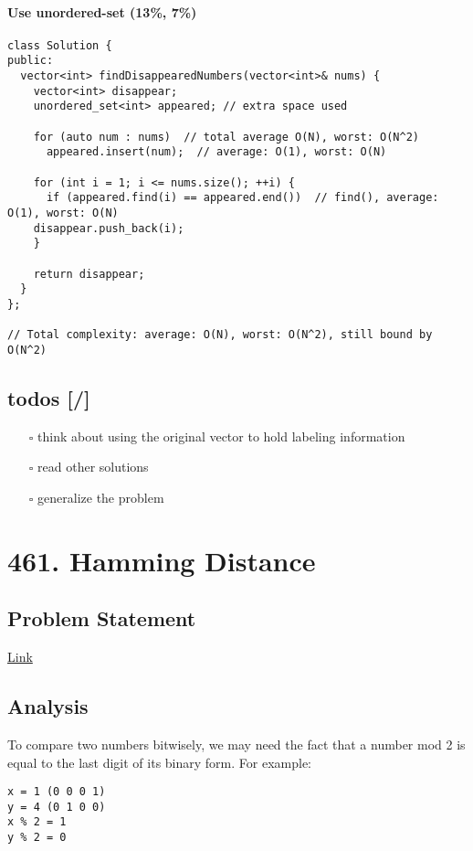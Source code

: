 \documentclass[12pt]{book}
\begin{document}
\subsubsection{Use unordered-set (13\%, 7\%)}
\label{sec:org7944351}
\begin{verbatim}
class Solution {
public:
  vector<int> findDisappearedNumbers(vector<int>& nums) {
    vector<int> disappear;
    unordered_set<int> appeared; // extra space used

    for (auto num : nums)  // total average O(N), worst: O(N^2)
      appeared.insert(num);  // average: O(1), worst: O(N)

    for (int i = 1; i <= nums.size(); ++i) {
      if (appeared.find(i) == appeared.end())  // find(), average: O(1), worst: O(N)
	disappear.push_back(i);
    }

    return disappear;
  }
};

// Total complexity: average: O(N), worst: O(N^2), still bound by O(N^2)
\end{verbatim}
\section{todos [/]}
\label{sec:org8197931}
\begin{itemize}
\item[{$\square$}] think about using the original vector to hold labeling information
\item[{$\square$}] read other solutions
\item[{$\square$}] generalize the problem
\end{itemize}
\chapter{461. Hamming Distance \label{orgf8b6eb9}}
\label{sec:org6b53c07}
\section{Problem Statement}
\label{sec:orga25014e}
\href{https://leetcode.com/problems/hamming-distance/}{Link}
\section{Analysis}
\label{sec:org37dff8e}
To compare two numbers bitwisely, we may need the fact that a number mod 2 is equal to the last digit of its binary form. For example:
\begin{verbatim}
x = 1 (0 0 0 1)
y = 4 (0 1 0 0)
x % 2 = 1
y % 2 = 0
\end{verbatim}
\end{document}
